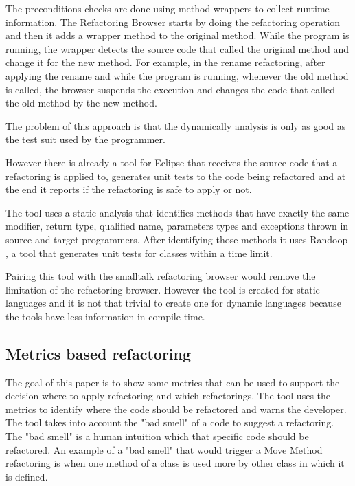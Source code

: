 The preconditions checks are done using method wrappers to collect runtime information. 
The Refactoring Browser starts by doing the refactoring operation and then it adds a wrapper method to the original method. 
While the program is running, the wrapper detects the source code that called the original method and change it for the new method.
For example, in the rename refactoring, after applying the rename and while the program is running, whenever the old method is called, the browser suspends the execution and changes the code that called the old method by the new method. 

The problem of this approach is that the dynamically analysis is only as good as the test suit used by the programmer.


%
However there is already a tool \cite{soares2010making} for Eclipse that receives the source code that a refactoring is applied to, generates unit tests to the code being refactored and at the end it reports if the refactoring is safe to apply or not.

The tool uses a static analysis that identifies methods that have exactly the same modifier, return type, qualified name, parameters types and exceptions thrown in source and target programmers.
After identifying those methods it uses Randoop \cite{pacheco2007feedback}, a tool that generates unit tests for classes within a time limit.

Pairing this tool with the smalltalk refactoring browser would remove the limitation of the refactoring browser.
However the tool is created for static languages and it is not that trivial to create one for dynamic languages because the tools have less information in compile time.


\subsection{Metrics based refactoring}

The goal of this paper \cite{simon2001metrics} is to show some metrics that can be used to support the decision where to apply refactoring and which refactorings.
The tool uses the metrics to identify where the code should be refactored and warns the developer.
The tool takes into account the "bad smell" of a code to suggest a refactoring. The "bad smell" is a human intuition which that specific code should be refactored. 
An example of a "bad smell" that would trigger a Move Method refactoring is when one method of a class is used more by other class in which it is defined.

